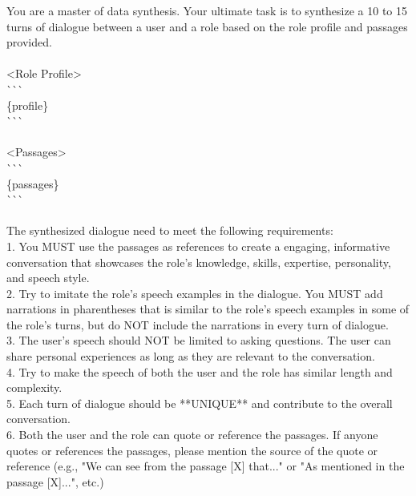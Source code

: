 \begin{figure*}
\begin{tcolorbox}
\end{tcolorbox}

\begin{tcolorbox}[
    colback=gray!10,      %
    colframe=gray!80,     %
    title=Synthesis Prompt for On-scene Chats,
    fonttitle=\bfseries,  %
    rounded corners,
    boxrule=0.5mm,        %
    width=\linewidth
]
\scriptsize

You are a master of data synthesis. Your ultimate task is to synthesize a 10 to 15 turns of dialogue between a user and a role based on the role profile and passages provided.\\
\\
<Role Profile>\\
\`{}\`{}\`{}\\
\{profile\}\\
\`{}\`{}\`{}\\
\\
<Passages>\\
\`{}\`{}\`{}\\
\{passages\}\\
\`{}\`{}\`{}\\
\\
The synthesized dialogue need to meet the following requirements:\\
1. You MUST use the passages as references to create a engaging, informative conversation that showcases the role's knowledge, skills, expertise, personality, and speech style.\\
2. Try to imitate the role's speech examples in the dialogue. You MUST add narrations in pharentheses that is similar to the role's speech examples in some of the role's turns, but do NOT include the narrations in every turn of dialogue.\\
3. The user's speech should NOT be limited to asking questions. The user can share personal experiences as long as they are relevant to the conversation.\\
4. Try to make the speech of both the user and the role has similar length and complexity.\\
5. Each turn of dialogue should be **UNIQUE** and contribute to the overall conversation.\\
6. Both the user and the role can quote or reference the passages. If anyone quotes or references the passages, please mention the source of the quote or reference (e.g., "We can see from the passage [X] that..." or "As mentioned in the passage [X]...", etc.)\\

\end{tcolorbox}
\end{figure*}
